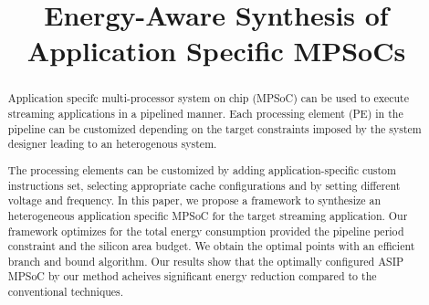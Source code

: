 \documentclass{sig-alternate}
\begin{document}
\title{Energy-Aware Synthesis of Application Specific MPSoCs }

\maketitle

\begin{abstract}

Application specifc multi-processor system on chip (MPSoC) can be used to execute streaming applications in a pipelined manner. Each processing element (PE) in the pipeline can be customized depending on the target constraints imposed by the system designer leading to an heterogenous system.
 
The processing elements can be customized by adding application-specific custom instructions set, selecting appropriate cache configurations and by setting different voltage and frequency. In this paper, we propose a framework to synthesize an heterogeneous application specific MPSoC for the target streaming application. Our framework optimizes for the total energy consumption provided the pipeline period constraint and the silicon area budget. We obtain the optimal points with an efficient branch and bound algorithm. Our results show that the optimally configured ASIP MPSoC by our method acheives significant energy reduction compared to the conventional techniques. 




\end{abstract}





%














%
%
%
%



\end{document}
